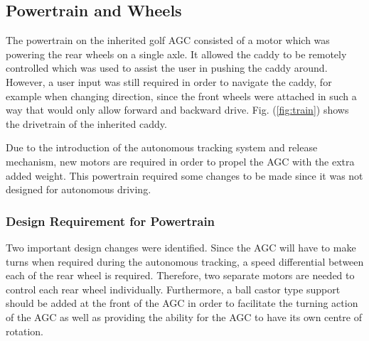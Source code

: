 \documentclass[11pt,landscape]{article}
\begin{document}
\begin{multicols}{2}
\subsection{Powertrain and Wheels}
The powertrain on the inherited golf AGC consisted of a motor which was
powering the rear wheels on a single axle. It allowed the caddy to be
remotely controlled which was used to assist the user in pushing the caddy
around. However, a user input was still required in order to navigate the
caddy, for example when changing direction, since the front wheels were
attached in such a way that would only allow forward and backward drive.
Fig. (\ref{fig:train}) shows the drivetrain of the inherited caddy.

Due to the introduction of the autonomous tracking system and release
mechanism, new motors are required in order to propel the AGC with the
extra added weight. This powertrain required some changes to be made since
it was not designed for autonomous driving.

\subsubsection{Design Requirement for Powertrain}
Two important design changes were identified. Since the AGC will have to
make turns when required during the autonomous tracking, a speed
differential between each of the rear wheel is required. Therefore, two
separate motors are needed to control each rear wheel individually.
Furthermore, a ball castor type support should be added at the front of the
AGC in order to facilitate the turning action of the AGC as well as
providing the ability for the AGC to have its own centre of rotation. 
    


\end{multicols}
\end{document}
